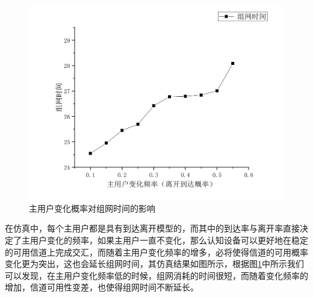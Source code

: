 \documentclass[a4paper,AutoFakeBold,oneside,12pt]{book}
\begin{document}
  \begin{figure}[htbp]
\centering %
\includegraphics[scale=0.3]{pictures/PU-time.png} 
\caption{主用户变化概率对组网时间的影响 } %
\label{PU-time}
\end{figure}
在仿真中，每个主用户都是具有到达离开模型的，而其中的到达率与离开率直接决定了主用户变化的频率，如果主用户一直不变化，那么认知设备可以更好地在稳定的可用信道上完成交汇，而随着主用户变化频率的增多，必将使得信道的可用概率变化更为突出，这也会延长组网时间，其仿真结果如图所示，根据图\ref{PU-time}中所示我们可以发现，在主用户变化频率低的时候，组网消耗的时间很短，而随着变化频率的增加，信道可用性变差，也使得组网时间不断延长。
\end{document}
